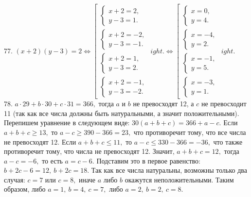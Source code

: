 77. $(x+2)(y-3)=2\Leftrightarrow \left[\begin{array}{l}\begin{cases}x+2=2,\\ y-3=1.\end{cases}\\ \begin{cases}x+2=-2,\\ y-3=-1.\end{cases}\\
\begin{cases}x+2=1,\\ y-3=2.\end{cases}\\ \begin{cases}x+2=-1,\\ y-3=-2.\end{cases}\end{array}
ight.\Leftrightarrow
\left[\begin{array}{l}\begin{cases}x=0,\\ y=4.\end{cases}\\ \begin{cases} x=-4,\\ y=2.\end{cases}\\
\begin{cases}x=-1,\\ y=5.\end{cases}\\ \begin{cases}x=-3,\\ y=1.\end{cases}\end{array}
ight.$\\
78. $a\cdot29+b\cdot30+c\cdot31=366,$ тогда $a$ и $b$ не превосходят 12, а $c$ не превосходит 11 (так как все числа должны быть натуральными, а значит положительными). Перепишем уравнение в следующем виде: $30(a+b+c)=366+a-c.$ Если $a+b+c\geqslant 13,$ то $a-c\geqslant390-366=23,$ что противоречит тому, что все числа не превосходят 12. Если $a+b+c\leqslant 11,$ то $a-c\leqslant 330-366=-36,$ что также противоречит тому, что числа не превосходят 12. Значит, $a+b+c=12,$ тогда $a-c=-6,$ то есть $a=c-6.$ Подставим это в первое равенство: $b+2c-6=12,\ b+2c=18.$ Так как все числа натуральны, возможны только два случая: $c=7$ или $c=8,$ иначе $a$ либо $b$ окажутся неположительными. Таким образом, либо $a=1,\ b=4,\ c=7,$ либо $a=2,\ b=2,\ c=8.$\\
